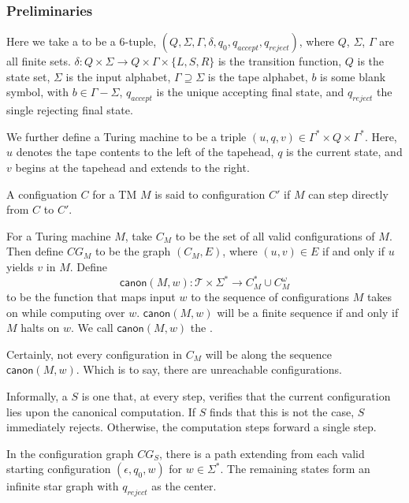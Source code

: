 \documentclass[11pt]{article}
\begin{document}
\subsubsection*{Preliminaries}
Here we take a  to be a 6-tuple,
$(Q, \Sigma, \Gamma, \delta, q_0, q_{accept}, q_{reject})$, where $Q$,
$\Sigma$, $\Gamma$ are all finite sets.
$\delta : Q \times \Sigma \rightarrow Q\times \Gamma \times \{L,S,R\}$
is the transition function, $Q$ is the state set, $\Sigma$ is the
input alphabet, $\Gamma \supseteq \Sigma$ is the tape alphabet, $b$ is
some blank symbol, with $b \in \Gamma - \Sigma$, $q_{accept}$ is the
unique accepting final state, and $q_{reject}$ the single rejecting
final state.

We further define a Turing machine  to be a triple
$(u, q, v) \in \Gamma^* \times Q \times \Gamma^*$. Here, $u$ denotes
the tape contents to the left of the tapehead, $q$ is the current
state, and $v$ begins at the tapehead and extends to the right.

A configuation $C$ for a TM $M$ is said to  configuration
$C'$ if $M$ can step directly from $C$ to $C'$.

For a Turing machine $M$, take $C_M$ to be the set of all valid
configurations of $M$. Then define $CG_M$ to be the graph $(C_M, E)$,
where $(u,v) \in E$ if and only if $u$ yields $v$ in $M$. Define
\[
  \textsf{canon}(M, w) : \mathcal{T} \times \Sigma^*
      \rightarrow
       C_M^*\cup C_M^\omega
\]
to be the function that maps input $w$ to the sequence of
configurations $M$ takes on while computing over
$w$. $\textsf{canon}(M, w)$ will be a finite sequence if and only if
$M$ halts on $w$. We call $\textsf{canon}(M, w)$ the .

Certainly, not every configuration in $C_M$ will be along the sequence
$\textsf{canon}(M,w)$. Which is to say, there are unreachable
configurations.

Informally, a  $S$ is one that, at
every step, verifies that the current configuration lies upon the
canonical computation. If $S$ finds that this is not the case, $S$
immediately rejects. Otherwise, the computation steps forward a single
step.

In the configuration graph $CG_S$, there is a path extending from each
valid starting configuration $(\epsilon, q_0, w)$ for $w \in \Sigma^*$. The remaining states form an infinite star graph with $q_{reject}$ as the center.
\end{document}
